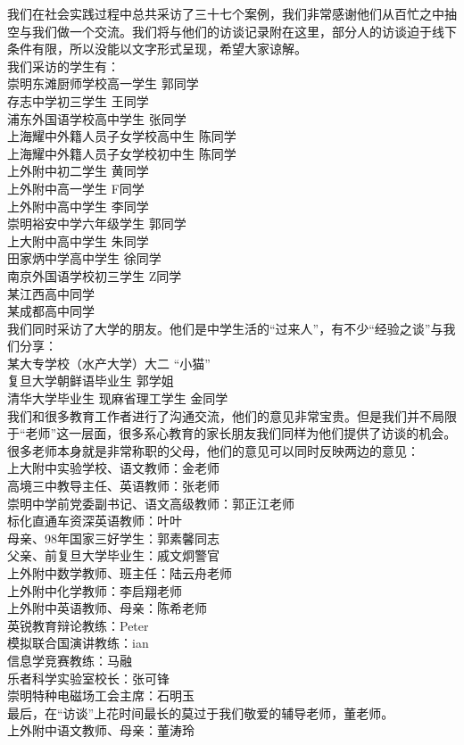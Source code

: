 \documentclass[12pt,UTF8]{ctexart}
\begin{document}
\par {
	
	我们在社会实践过程中总共采访了三十七个案例，我们非常感谢他们从百忙之中抽空与我们做一个交流。我们将与他们的访谈记录附在这里，部分人的访谈迫于线下条件有限，所以没能以文字形式呈现，希望大家谅解。\\
	我们采访的学生有：\\
	崇明东滩厨师学校高一学生  郭同学\\
	存志中学初三学生   王同学\\
	浦东外国语学校高中学生   张同学\\
	上海耀中外籍人员子女学校高中生   陈同学\\
	上海耀中外籍人员子女学校初中生   陈同学\\
	上外附中初二学生   黄同学\\
	上外附中高一学生   F同学\\
	上外附中高中学生   李同学\\
	崇明裕安中学六年级学生   郭同学\\
	上大附中高中学生   朱同学\\
	田家炳中学高中学生   徐同学\\
	南京外国语学校初三学生   Z同学\\
	某江西高中同学\\
	某成都高中同学\\
	我们同时采访了大学的朋友。他们是中学生活的“过来人”，有不少“经验之谈”与我们分享：\\
	某大专学校（水产大学）大二   “小猫”\\
	复旦大学朝鲜语毕业生   郭学姐\\
	清华大学毕业生 现麻省理工学生   金同学\\
	
	我们和很多教育工作者进行了沟通交流，他们的意见非常宝贵。但是我们并不局限于“老师”这一层面，很多系心教育的家长朋友我们同样为他们提供了访谈的机会。很多老师本身就是非常称职的父母，他们的意见可以同时反映两边的意见：\\
	上大附中实验学校、语文教师：金老师\\
	高境三中教导主任、英语教师：张老师\\
	崇明中学前党委副书记、语文高级教师：郭正江老师\\
	标化直通车资深英语教师：叶叶\\
	母亲、98年国家三好学生：郭素馨同志\\
	父亲、前复旦大学毕业生：戚文炯警官\\
	上外附中数学教师、班主任：陆云舟老师\\
	上外附中化学教师：李启翔老师\\
	上外附中英语教师、母亲：陈希老师\\
	英锐教育辩论教练：Peter\\
	模拟联合国演讲教练：ian\\
	信息学竞赛教练：马融\\
	乐者科学实验室校长：张可锋\\
	崇明特种电磁场工会主席：石明玉\\
	最后，在“访谈”上花时间最长的莫过于我们敬爱的辅导老师，董老师。\\
	上外附中语文教师、母亲：董涛玲\\
	
}
\end{document}
